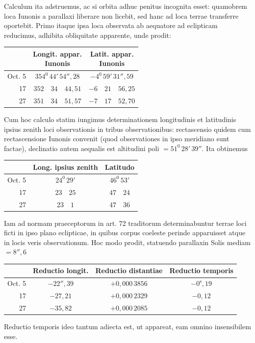Calculum ita adstruemus, ac si orbita adhuc penitus incognita esset:
quamobrem loca Iunonis a parallaxi liberare non licebit, sed hanc ad loca
terrae transferre oportebit. Primo itaque ipsa loca observata ab aequatore ad
eclipticam reducimus, adhibita obliquitate apparente, unde prodit:
\begin{center}
\small\setlength{\tabcolsep}{6pt}\renewcommand{\arraystretch}{1.2}
\begin{tabular}{|r|c|c|}
\hline
 & \shortstack{Longit. appar.\\Iunonis} & \shortstack{Latit. appar.\\Iunonis}\\
\hline
Oct. 5 & $354^{0}\,44'\,54''{,}28$ & $-4^{0}\,59'\,31''{,}59$\\
17 & $352\quad34\quad44{,}51$ & $-6\quad21\quad56{,}25$\\
27 & $351\quad34\quad51{,}57$ & $-7\quad17\quad52{,}70$\\
\hline
\end{tabular}
\end{center}

Cum hoc calculo statim iungimus determinationem longitudinis et latitudinis
ipsius zenith loci observationis in tribus observationibus: rectascensio quidem
cum rectascensione Iunonis convenit (quod observationes in ipso meridiano
sunt factae), declinatio autem aequalis est altitudini poli $=51^{0}\,28'\,39''$.
Ita obtinemus
\begin{center}
\small\setlength{\tabcolsep}{6pt}\renewcommand{\arraystretch}{1.2}
\begin{tabular}{|r|c|c|}
\hline
 & Long. ipsius zenith & Latitudo\\
\hline
Oct. 5 & $24^{0}\,29'$ & $46^{0}\,53'$\\
17 & $23\quad25$ & $47\quad24$\\
27 & $23\quad1$ & $47\quad36$\\
\hline
\end{tabular}
\end{center}
\noindent{}Iam ad normam praeceptorum in art. 72 traditorum determinabuntur terrae
loci ficti in ipso plano eclipticae, in quibus corpus coeleste perinde apparuisset
atque in locis veris observationum. Hoc modo prodit, statuendo parallaxin
Solis mediam $=8''{,}6$
\begin{center}
\small\setlength{\tabcolsep}{4pt}\renewcommand{\arraystretch}{1.2}
\begin{tabular}{|r|c|c|c|}
\hline
 & Reductio longit. & Reductio distantiae & Reductio temporis\\
\hline
Oct. 5 & $-22''{,}39$ & $+0{,}000\,3856$ & $-0^{\mathrm{s}}{,}19$\\
17 & $-27{,}21$ & $+0{,}000\,2329$ & $-0{,}12$\\
27 & $-35{,}82$ & $+0{,}000\,2085$ & $-0{,}12$\\
\hline
\end{tabular}
\end{center}
\noindent Reductio temporis ideo tantum adiecta est, ut appareat, eam omnino insensibilem
esse.

